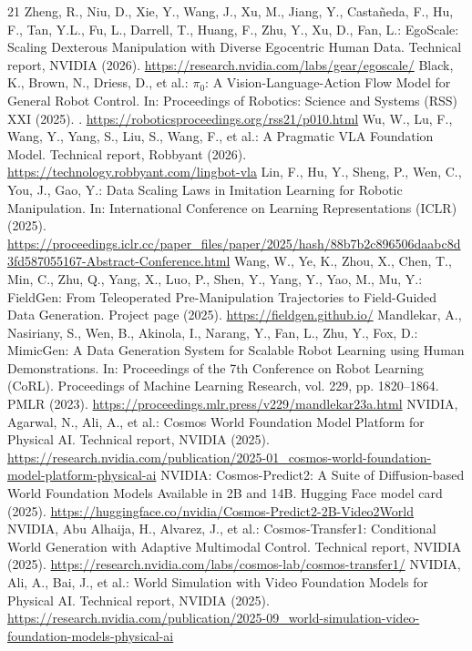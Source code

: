 \documentclass[runningheads]{llncs}
\begin{document}
\begin{thebibliography}{21}
 Zheng, R., Niu, D., Xie, Y., Wang, J., Xu, M., Jiang, Y., Casta\~neda, F., Hu, F., Tan, Y.L., Fu, L., Darrell, T., Huang, F., Zhu, Y., Xu, D., Fan, L.: EgoScale: Scaling Dexterous Manipulation with Diverse Egocentric Human Data. Technical report, NVIDIA (2026). \url{https://research.nvidia.com/labs/gear/egoscale/}
 Black, K., Brown, N., Driess, D., et al.: $\pi_0$: A Vision-Language-Action Flow Model for General Robot Control. In: Proceedings of Robotics: Science and Systems (RSS) XXI (2025). . \url{https://roboticsproceedings.org/rss21/p010.html}
 Wu, W., Lu, F., Wang, Y., Yang, S., Liu, S., Wang, F., et al.: A Pragmatic VLA Foundation Model. Technical report, Robbyant (2026). \url{https://technology.robbyant.com/lingbot-vla}
 Lin, F., Hu, Y., Sheng, P., Wen, C., You, J., Gao, Y.: Data Scaling Laws in Imitation Learning for Robotic Manipulation. In: International Conference on Learning Representations (ICLR) (2025). \url{https://proceedings.iclr.cc/paper_files/paper/2025/hash/88b7b2c896506daabc8d3fd587055167-Abstract-Conference.html}
 Wang, W., Ye, K., Zhou, X., Chen, T., Min, C., Zhu, Q., Yang, X., Luo, P., Shen, Y., Yang, Y., Yao, M., Mu, Y.: FieldGen: From Teleoperated Pre-Manipulation Trajectories to Field-Guided Data Generation. Project page (2025). \url{https://fieldgen.github.io/}
 Mandlekar, A., Nasiriany, S., Wen, B., Akinola, I., Narang, Y., Fan, L., Zhu, Y., Fox, D.: MimicGen: A Data Generation System for Scalable Robot Learning using Human Demonstrations. In: Proceedings of the 7th Conference on Robot Learning (CoRL). Proceedings of Machine Learning Research, vol. 229, pp. 1820--1864. PMLR (2023). \url{https://proceedings.mlr.press/v229/mandlekar23a.html}
 NVIDIA, Agarwal, N., Ali, A., et al.: Cosmos World Foundation Model Platform for Physical AI. Technical report, NVIDIA (2025). \url{https://research.nvidia.com/publication/2025-01_cosmos-world-foundation-model-platform-physical-ai}
 NVIDIA: Cosmos-Predict2: A Suite of Diffusion-based World Foundation Models Available in 2B and 14B. Hugging Face model card (2025). \url{https://huggingface.co/nvidia/Cosmos-Predict2-2B-Video2World}
 NVIDIA, Abu Alhaija, H., Alvarez, J., et al.: Cosmos-Transfer1: Conditional World Generation with Adaptive Multimodal Control. Technical report, NVIDIA (2025). \url{https://research.nvidia.com/labs/cosmos-lab/cosmos-transfer1/}
 NVIDIA, Ali, A., Bai, J., et al.: World Simulation with Video Foundation Models for Physical AI. Technical report, NVIDIA (2025). \url{https://research.nvidia.com/publication/2025-09_world-simulation-video-foundation-models-physical-ai}

\end{thebibliography}
\end{document}
